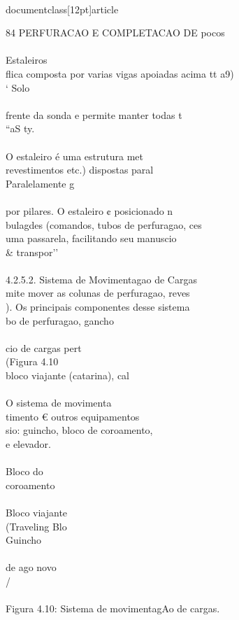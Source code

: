 \\documentclass[12pt]{article}
\begin{document}
84 PERFURACAO E COMPLETACAO DE pocos\\
\\
Estaleiros\\
flica composta por varias vigas apoiadas acima tt a9)\\
‘ Solo\\
\\
frente da sonda e permite manter todas t\\
“aS ty.\\
\\
O estaleiro é uma estrutura met\\
revestimentos etc.) dispostas paral\\
Paralelamente g\\
\\
por pilares. O estaleiro ¢ posicionado n\\
bulagdes (comandos, tubos de perfuragao, ces\\
uma passarela, facilitando seu manuscio \\& transpor'’\\
\\
4.2.5.2. Sistema de Movimentagao de Cargas\\
mite mover as colunas de perfuragao, reves\\
). Os principais componentes desse sistema\\
bo de perfuragao, gancho\\
\\
cio de cargas pert\\
(Figura 4.10\\
bloco viajante (catarina), cal\\
\\
O sistema de movimenta\\
timento € outros equipamentos\\
sio: guincho, bloco de coroamento,\\
e elevador.\\
\\
Bloco do\\
coroamento\\
\\
Bloco viajante\\
(Traveling Blo\\
Guincho\\
\\
de ago novo\\
/\\
\\
Figura 4.10: Sistema de movimentagAo de cargas.\\
\end{document}

